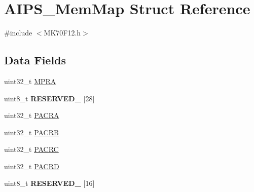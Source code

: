 \hypertarget{struct_a_i_p_s___mem_map}{}\section{A\+I\+P\+S\+\_\+\+Mem\+Map Struct Reference}
\label{struct_a_i_p_s___mem_map}


{\ttfamily \#include $<$M\+K70\+F12.\+h$>$}

\subsection*{Data Fields}
\begin{DoxyCompactItemize}
\item 
uint32\+\_\+t \hyperlink{struct_a_i_p_s___mem_map_a5ee5a8f31c77bbd35f1bb5f7a1f92c59}{M\+P\+R\+A}
\item 
\hypertarget{struct_a_i_p_s___mem_map_a7d17adcaf60d9f54559d2482f4e32999}{}uint8\+\_\+t {\bfseries R\+E\+S\+E\+R\+V\+E\+D\+\_} \mbox{[}28\mbox{]}\label{struct_a_i_p_s___mem_map_a7d17adcaf60d9f54559d2482f4e32999}

\item 
uint32\+\_\+t \hyperlink{struct_a_i_p_s___mem_map_a4b1afda7928f39099d6cc26a0b17da11}{P\+A\+C\+R\+A}
\item 
uint32\+\_\+t \hyperlink{struct_a_i_p_s___mem_map_aa6897cc68c3e0e6bff51c421049ba3f4}{P\+A\+C\+R\+B}
\item 
uint32\+\_\+t \hyperlink{struct_a_i_p_s___mem_map_acbd09d77313ec522210dbcabec37c9f5}{P\+A\+C\+R\+C}
\item 
uint32\+\_\+t \hyperlink{struct_a_i_p_s___mem_map_a98bd3ff2455e9fccb9cd7d06cc090370}{P\+A\+C\+R\+D}
\item 
\hypertarget{struct_a_i_p_s___mem_map_a433fab6497424688fbd776d7dfbfe37a}{}uint8\+\_\+t {\bfseries R\+E\+S\+E\+R\+V\+E\+D\+\_} \mbox{[}16\mbox{]}\label{struct_a_i_p_s___mem_map_a433fab6497424688fbd776d7dfbfe37a}


\end{DoxyCompactItemize}
